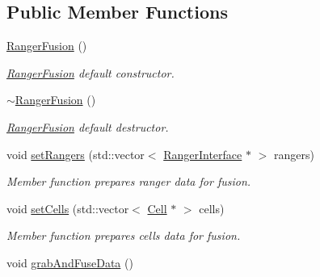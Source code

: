 \subsection*{Public Member Functions}
\begin{DoxyCompactItemize}
\item 
\hyperlink{classRangerFusion_ab09391c929404c32ad3e2cb7ab1d38bc}{Ranger\+Fusion} ()\hypertarget{classRangerFusion_ab09391c929404c32ad3e2cb7ab1d38bc}{}\label{classRangerFusion_ab09391c929404c32ad3e2cb7ab1d38bc}

\begin{DoxyCompactList}\small\item\em \hyperlink{classRangerFusion}{Ranger\+Fusion} default constructor. \end{DoxyCompactList}\item 
\hyperlink{classRangerFusion_a25fd5aaa541efc80c5251bc9be903379}{$\sim$\+Ranger\+Fusion} ()\hypertarget{classRangerFusion_a25fd5aaa541efc80c5251bc9be903379}{}\label{classRangerFusion_a25fd5aaa541efc80c5251bc9be903379}

\begin{DoxyCompactList}\small\item\em \hyperlink{classRangerFusion}{Ranger\+Fusion} default destructor. \end{DoxyCompactList}\item 
void \hyperlink{classRangerFusion_a01909c08b2a974e68b031056db730aba}{set\+Rangers} (std\+::vector$<$ \hyperlink{classRangerInterface}{Ranger\+Interface} $\ast$ $>$ rangers)
\begin{DoxyCompactList}\small\item\em Member function prepares ranger data for fusion. \end{DoxyCompactList}\item 
void \hyperlink{classRangerFusion_ae3128f8cc8f4cb955d8db661aefba3dc}{set\+Cells} (std\+::vector$<$ \hyperlink{classCell}{Cell} $\ast$ $>$ cells)
\begin{DoxyCompactList}\small\item\em Member function prepares cells data for fusion. \end{DoxyCompactList}\item 
void \hyperlink{classRangerFusion_aa9265f72bc3572567c9cf98cf6d9f0e1}{grab\+And\+Fuse\+Data} ()\hypertarget{classRangerFusion_aa9265f72bc3572567c9cf98cf6d9f0e1}{}\label{classRangerFusion_aa9265f72bc3572567c9cf98cf6d9f0e1}


\end{DoxyCompactItemize}
